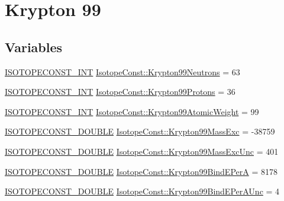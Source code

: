\hypertarget{group___isotope_const-_krypton-_kr99}{}\section{Krypton 99}
\label{group___isotope_const-_krypton-_kr99}
\subsection*{Variables}
\begin{DoxyCompactItemize}
\item 
\mbox{\hyperlink{group___isotope_const-_macros_ga5f18360b3e99483a35c32d789e62621c}{I\+S\+O\+T\+O\+P\+E\+C\+O\+N\+S\+T\+\_\+\+I\+NT}} \mbox{\hyperlink{group___isotope_const-_krypton-_kr99_gaeff1bd48719092124245a75da09318d0}{Isotope\+Const\+::\+Krypton99\+Neutrons}} = 63
\item 
\mbox{\hyperlink{group___isotope_const-_macros_ga5f18360b3e99483a35c32d789e62621c}{I\+S\+O\+T\+O\+P\+E\+C\+O\+N\+S\+T\+\_\+\+I\+NT}} \mbox{\hyperlink{group___isotope_const-_krypton-_kr99_ga222a4a115d66c7426312b34d7e9c68e7}{Isotope\+Const\+::\+Krypton99\+Protons}} = 36
\item 
\mbox{\hyperlink{group___isotope_const-_macros_ga5f18360b3e99483a35c32d789e62621c}{I\+S\+O\+T\+O\+P\+E\+C\+O\+N\+S\+T\+\_\+\+I\+NT}} \mbox{\hyperlink{group___isotope_const-_krypton-_kr99_ga2af73d7a6525234c34d1e221dd6f8899}{Isotope\+Const\+::\+Krypton99\+Atomic\+Weight}} = 99
\item 
\mbox{\hyperlink{group___isotope_const-_macros_ga8f45a7272ce02c0b4c65c44636ed719a}{I\+S\+O\+T\+O\+P\+E\+C\+O\+N\+S\+T\+\_\+\+D\+O\+U\+B\+LE}} \mbox{\hyperlink{group___isotope_const-_krypton-_kr99_ga754dbbcac9c3c541906ab02b82414590}{Isotope\+Const\+::\+Krypton99\+Mass\+Exc}} = -\/38759
\item 
\mbox{\hyperlink{group___isotope_const-_macros_ga8f45a7272ce02c0b4c65c44636ed719a}{I\+S\+O\+T\+O\+P\+E\+C\+O\+N\+S\+T\+\_\+\+D\+O\+U\+B\+LE}} \mbox{\hyperlink{group___isotope_const-_krypton-_kr99_ga0c942a6cc72aab7497f398aecb7f5aaa}{Isotope\+Const\+::\+Krypton99\+Mass\+Exc\+Unc}} = 401
\item 
\mbox{\hyperlink{group___isotope_const-_macros_ga8f45a7272ce02c0b4c65c44636ed719a}{I\+S\+O\+T\+O\+P\+E\+C\+O\+N\+S\+T\+\_\+\+D\+O\+U\+B\+LE}} \mbox{\hyperlink{group___isotope_const-_krypton-_kr99_ga4a92534a9c34c43683a328da019b0d8e}{Isotope\+Const\+::\+Krypton99\+Bind\+E\+PerA}} = 8178
\item 
\mbox{\hyperlink{group___isotope_const-_macros_ga8f45a7272ce02c0b4c65c44636ed719a}{I\+S\+O\+T\+O\+P\+E\+C\+O\+N\+S\+T\+\_\+\+D\+O\+U\+B\+LE}} \mbox{\hyperlink{group___isotope_const-_krypton-_kr99_gac435f85d991415aa4e605f7a284a559b}{Isotope\+Const\+::\+Krypton99\+Bind\+E\+Per\+A\+Unc}} = 4

\end{DoxyCompactItemize}
